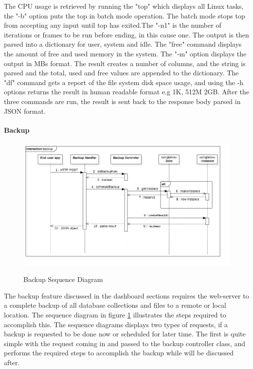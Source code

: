 The CPU usage is retrieved by running the "top" which displays all Linux tasks, the "-b" option puts the top in batch mode operation. The batch mode stops top from accepting any input until top has exited.The "-n1" is the number of iterations or frames to be run before ending, in this cause one. The output is then parsed into a dictionary for user, system and idle. 
The "free" command displays the amount of free and used memory in the system. The "-m" option displays the output in MBs format. The result creates a number of columns, and the string is parsed and the total, used and free values are appended to the dictionary. 
The "df" command gets a report of the file system disk space usage, and using the -h options returns the result in human readable format e.g 1K, 512M 2GB. After the three commands are run, the result is sent back to the response body parsed in JSON format.

\paragraph{Backup}

\begin{figure}[!h]
    \caption{Backup Sequence Diagram}
    \centering
    \includegraphics[width=150mm]{images/sequence/backup}
    \label{fig:backup-s}
\end{figure}

The backup feature discussed in the dashboard sections requires the web-server to a complete backup of all database collections and files to a remote or local location. The sequence diagram in figure \ref{fig:backup-s} illustrates the steps required to accomplish this. The sequence diagrams displays two types of requests, if a backup is requested to be done now or scheduled for later time. The first is quite simple with the request coming in and passed to the backup controller class, and performs the required steps to accomplish the backup while will be discussed after.

